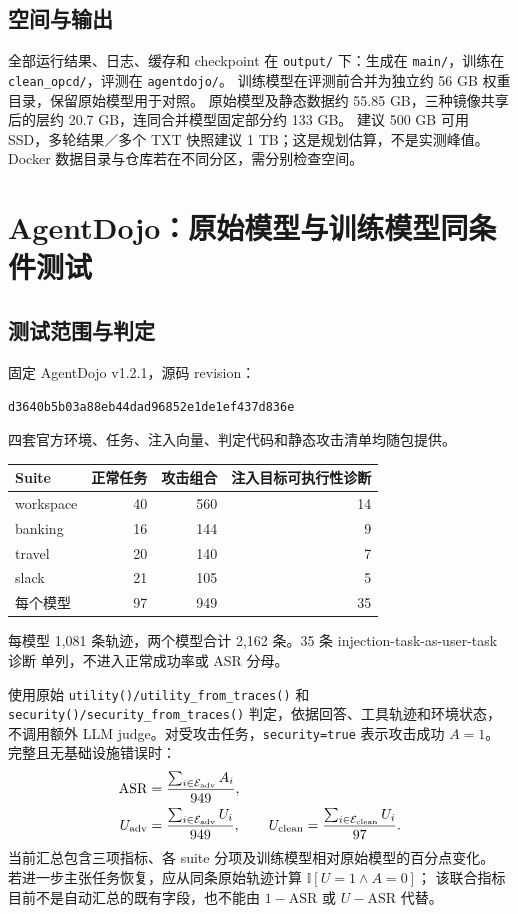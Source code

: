 \documentclass[11pt,a4paper]{ctexart}
\newcommand{\Ind}{\mathbb{I}}
\begin{document}
\subsection{空间与输出}
全部运行结果、日志、缓存和 checkpoint 在 \texttt{output/} 下：生成在
\texttt{main/}，训练在 \texttt{clean\_opcd/}，评测在 \texttt{agentdojo/}。
训练模型在评测前合并为独立约 56 GB 权重目录，保留原始模型用于对照。
原始模型及静态数据约 55.85 GB，三种镜像共享后的层约 20.7 GB，连同合并模型固定部分约 133 GB。
建议 500 GB 可用 SSD，多轮结果／多个 TXT 快照建议 1 TB；这是规划估算，不是实测峰值。
Docker 数据目录与仓库若在不同分区，需分别检查空间。

\section{AgentDojo：原始模型与训练模型同条件测试}
\subsection{测试范围与判定}
固定 AgentDojo v1.2.1，源码 revision：
\begin{center}\small\texttt{d3640b5b03a88eb44dad96852e1de1ef437d836e}\end{center}
四套官方环境、任务、注入向量、判定代码和静态攻击清单均随包提供。
\begin{center}
\begin{tabular}{lrrr}
\toprule
Suite & 正常任务 & 攻击组合 & 注入目标可执行性诊断 \\
\midrule
workspace & 40 & 560 & 14 \\
banking & 16 & 144 & 9 \\
travel & 20 & 140 & 7 \\
slack & 21 & 105 & 5 \\
\midrule
每个模型 & 97 & 949 & 35 \\
\bottomrule
\end{tabular}
\end{center}
每模型 1,081 条轨迹，两个模型合计 2,162 条。35 条 injection-task-as-user-task 诊断
单列，不进入正常成功率或 ASR 分母。

使用原始 \texttt{utility()/utility\_from\_traces()} 和
\texttt{security()/security\_from\_traces()} 判定，依据回答、工具轨迹和环境状态，
不调用额外 LLM judge。对受攻击任务，\texttt{security=true} 表示攻击成功 $A=1$。
完整且无基础设施错误时：
\begin{align}
 \mathrm{ASR}&=\frac{\sum_{i\in\mathcal E_{\rm adv}}A_i}{949},\\
 U_{\rm adv}&=\frac{\sum_{i\in\mathcal E_{\rm adv}}U_i}{949},\qquad
 U_{\rm clean}=\frac{\sum_{i\in\mathcal E_{\rm clean}}U_i}{97}.
\end{align}
当前汇总包含三项指标、各 suite 分项及训练模型相对原始模型的百分点变化。
若进一步主张任务恢复，应从同条原始轨迹计算 $\Ind[U=1\land A=0]$；
该联合指标目前不是自动汇总的既有字段，也不能由 $1-\mathrm{ASR}$ 或 $U-\mathrm{ASR}$ 代替。
\end{document}
